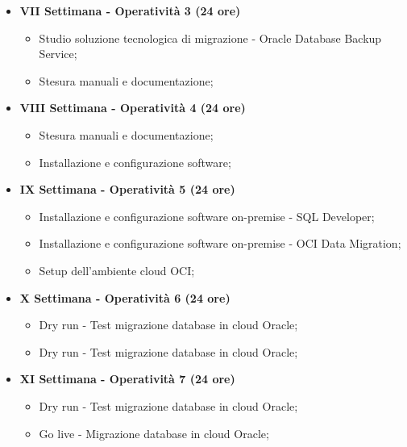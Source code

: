 {\begin{itemize}
        \item \textbf{VII Settimana - Operatività 3 (24 ore)} %
        \begin{itemize}
            \item Studio soluzione tecnologica di migrazione - Oracle Database Backup Service;
            \item Stesura manuali e documentazione;
        \end{itemize}

        \item \textbf{VIII Settimana - Operatività 4 (24 ore)} %
        \begin{itemize}
            \item Stesura manuali e documentazione;
            \item Installazione e configurazione software;
        \end{itemize}

        \item \textbf{IX Settimana - Operatività 5 (24 ore)} %
        \begin{itemize}
            \item Installazione e configurazione software on-premise - SQL Developer;
            \item Installazione e configurazione software on-premise - OCI Data Migration;
            \item Setup dell'ambiente cloud OCI;
        \end{itemize}

        \item \textbf{X Settimana - Operatività 6 (24 ore)} %
        \begin{itemize}
            \item Dry run - Test migrazione database in cloud Oracle;
            \item Dry run - Test migrazione database in cloud Oracle;
        \end{itemize}

        \item \textbf{XI Settimana - Operatività 7 (24 ore)} %
        \begin{itemize}
            \item Dry run - Test migrazione database in cloud Oracle;
            \item Go live - Migrazione database in cloud Oracle;
        \end{itemize}


\end{itemize}}
